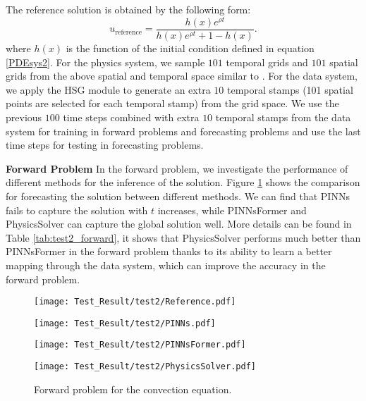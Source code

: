 \documentclass[preprint,11pt]{elsarticle}
\begin{document}
The reference solution is obtained by the following form:
\begin{equation}
    u_{\text{reference}} = \frac{h(x) e^{\rho t}}{h(x)e^{\rho t}+1-h(x)}.
\end{equation}
where $h(x)$ is the function of the initial condition defined in equation \eqref{PDEsys2}.
For the physics system, we sample $101$ temporal grids and $101$ spatial grids from the above spatial and temporal space similar to \cite{zhao2023pinnsformer}. For the data system, we apply the HSG module to generate an extra $10$ temporal stamps (101 spatial points are selected for each temporal stamp) from the grid space. We use the previous $100$ time steps combined with extra $10$ temporal stamps from the data system for training in forward problems and forecasting problems and use the last time steps for testing in forecasting problems.

\textbf{Forward Problem}
In the forward problem, we investigate the performance of different methods for the inference of the solution. Figure \ref{fig:test2_forward} shows the comparison for forecasting the solution between different methods. We can find that PINNs fails to capture the solution with $t$ increases, while PINNsFormer and PhysicsSolver can capture the global solution well. More details can be found in Table \ref{tab:test2_forward}, it shows that PhysicsSolver performs much better than PINNsFormer in the forward problem thanks to its ability to learn a better mapping through the data system, which can improve the accuracy in the forward problem.\\

\begin{figure}[h]
    \begin{minipage}[b]{0.49\textwidth}
        \centering
        \texttt{[image: Test\_Result/test2/Reference.pdf]} 
    \end{minipage}
    \begin{minipage}[b]{0.49\textwidth}
        \centering
        \texttt{[image: Test\_Result/test2/PINNs.pdf]} 
    \end{minipage}
    \begin{minipage}[b]{0.49\textwidth}
        \centering
        \texttt{[image: Test\_Result/test2/PINNsFormer.pdf]} 
    \end{minipage}
    \begin{minipage}[b]{0.49\textwidth}
        \centering
        \texttt{[image: Test\_Result/test2/PhysicsSolver.pdf]} 
    \end{minipage}
    \caption{Forward problem for the convection equation.}
    \label{fig:test2_forward}
\end{figure}
\end{document}
